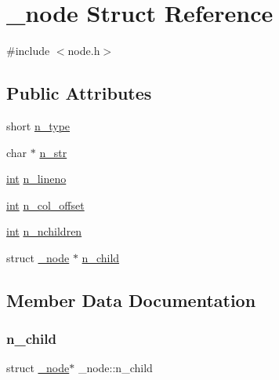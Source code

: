 \hypertarget{struct__node}{}\section{\+\_\+node Struct Reference}
\label{struct__node}


{\ttfamily \#include $<$node.\+h$>$}

\subsection*{Public Attributes}
\begin{DoxyCompactItemize}
\item 
short \mbox{\hyperlink{struct__node_a1e33106d8300c321ff2f0f42e66de92d}{n\+\_\+type}}
\item 
char $\ast$ \mbox{\hyperlink{struct__node_af35079752ee060258bf77220fba1b166}{n\+\_\+str}}
\item 
\mbox{\hyperlink{warnings_8h_a74f207b5aa4ba51c3a2ad59b219a423b}{int}} \mbox{\hyperlink{struct__node_a0e7e01a2a66d8b94029ed2dcdadb139f}{n\+\_\+lineno}}
\item 
\mbox{\hyperlink{warnings_8h_a74f207b5aa4ba51c3a2ad59b219a423b}{int}} \mbox{\hyperlink{struct__node_a6e2c596f659504275df03b590c25b4bc}{n\+\_\+col\+\_\+offset}}
\item 
\mbox{\hyperlink{warnings_8h_a74f207b5aa4ba51c3a2ad59b219a423b}{int}} \mbox{\hyperlink{struct__node_acf53660d344ef4ecfacb77c3658848ea}{n\+\_\+nchildren}}
\item 
struct \mbox{\hyperlink{struct__node}{\+\_\+node}} $\ast$ \mbox{\hyperlink{struct__node_ad86383d3bc0a5c37e389ee7bd2804752}{n\+\_\+child}}
\end{DoxyCompactItemize}


\subsection{Member Data Documentation}
\mbox{\label{struct__node_ad86383d3bc0a5c37e389ee7bd2804752}} 
\subsubsection{\texorpdfstring{n\_child}{n\_child}}
{\footnotesize\ttfamily struct \mbox{\hyperlink{struct__node}{\+\_\+node}}$\ast$ \+\_\+node\+::n\+\_\+child}

\mbox{\label{struct__node_a6e2c596f659504275df03b590c25b4bc}} 
